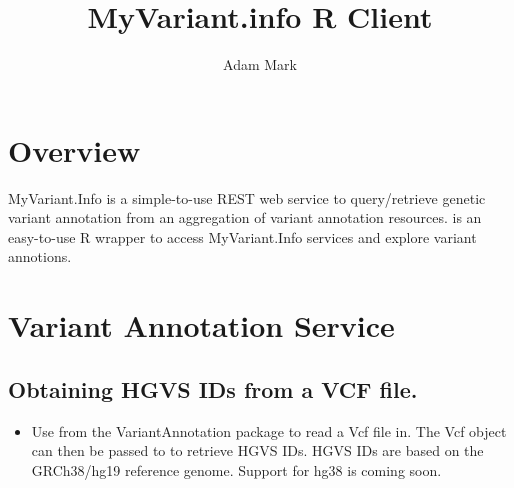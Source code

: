 \documentclass[12pt]{article}
\title{MyVariant.info R Client}
\author{Adam Mark}
\begin{document}


\maketitle

\tableofcontents

\section{Overview}

MyVariant.Info is a simple-to-use REST web service to query/retrieve genetic variant annotation from an aggregation of variant annotation resources.  is an easy-to-use R wrapper to access MyVariant.Info services and explore variant annotions.
\section{Variant Annotation Service}

\subsection{Obtaining HGVS IDs from a VCF file. }

\begin{itemize}
\item Use  from the VariantAnnotation package to read a Vcf file in. The Vcf object can then be passed to  to retrieve HGVS IDs. HGVS IDs are based on the GRCh38/hg19 reference genome. Support for hg38 is coming soon.
\end{itemize} 
\end{document}
